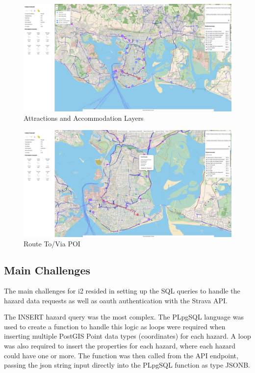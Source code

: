 \begin{figure}[!ht]
  \centering
  \includegraphics[width=425px]{figures/Progress Images/Iteration-2/SR40-45/SR40 - Attractions and Accommodation KeyPOI.png}
  \caption{Attractions and Accommodation Layers}
  \label{fig:poi-layers}
\end{figure}

\begin{figure}[!ht]
  \centering
  \includegraphics[width=425px]{figures/Progress Images/Iteration-2/SR40-45/SR45 - Route ToVia POI.png}
  \caption{Route To/Via POI}
  \label{fig:poi-route}
\end{figure}

\subsection{Main Challenges}
\label{iteration2:main-challenges}

The main challenges for i2 resided in setting up the SQL queries to handle the hazard data requests as well as oauth authentication with the Strava API.

The INSERT hazard query was the most complex. The PLpgSQL language was used to create a function to handle  this logic as loops were required when inserting multiple PostGIS Point data types (coordinates) for each hazard. A loop was also required to insert the properties for each hazard, where each hazard could have one or more. The function was then called from the API endpoint, passing the json string input directly into the PLpgSQL function as type JSONB.

